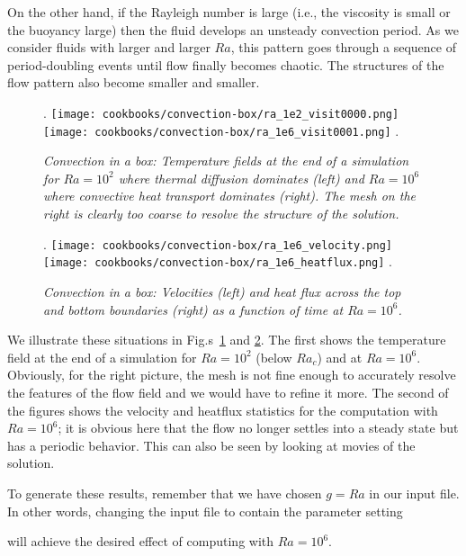 \documentclass{article}
\begin{document}
On the other hand, if the Rayleigh number is large (i.e., the viscosity is
small or the buoyancy large) then the fluid develops an unsteady convection
period. As we consider fluids with larger and larger $Ra$, this pattern goes
through a sequence of period-doubling events until flow finally becomes chaotic.
The structures of the flow pattern also become smaller and smaller.

\begin{figure}
\phantom.
\hfill
\texttt{[image: cookbooks/convection-box/ra\_1e2\_visit0000.png]}
\hfill
\texttt{[image: cookbooks/convection-box/ra\_1e6\_visit0001.png]}
\hfill
\phantom.
\caption{\it Convection in a box: Temperature fields at the end of a
simulation for $Ra=10^2$ where thermal diffusion dominates (left) and $Ra=10^6$
where convective heat transport dominates (right).
The mesh on the right is clearly too coarse to resolve the structure of the solution.}
\label{fig:convection-box-fields-different-Ra}
\end{figure}

\begin{figure}
\phantom.
\hfill
\texttt{[image: cookbooks/convection-box/ra\_1e6\_velocity.png]}
\hfill
\texttt{[image: cookbooks/convection-box/ra\_1e6\_heatflux.png]}
\hfill
\phantom.
\caption{\it Convection in a box: Velocities (left) and heat flux across the
top and bottom boundaries (right) as a function of time at $Ra=10^6$.}
\label{fig:convection-box-stats-different-Ra}
\end{figure}

We illustrate these situations in
Fig.s~\ref{fig:convection-box-fields-different-Ra} and
\ref{fig:convection-box-stats-different-Ra}. The first shows the temperature
field at the end of a simulation for $Ra=10^2$ (below $Ra_c$) and at $Ra=10^6$.
Obviously, for the right picture, the mesh is not fine enough to accurately
resolve the features of the flow field and we would have to refine it more. The
second of the figures shows the velocity and heatflux statistics for the
computation with $Ra=10^6$; it is obvious here that the flow no longer settles
into a steady state but has a periodic behavior. This can also be seen by
looking at movies of the solution.

To generate these results, remember that we have chosen 
$g=Ra$ in our input file. In other words, changing the input file to
contain the parameter setting
%

%
will achieve the desired effect of computing with $Ra=10^6$.
\end{document}
